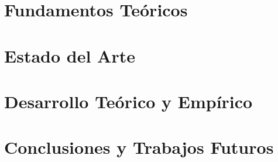 \documentclass[print, color]{ugrTFG}
\let\cleardoublepage\clearpage
\begin{document}
\maketitle

\frontmatter %

   


                    

            
               


\mainmatter %

\part{Fundamentos Teóricos}



\part{Estado del Arte}


\part{Desarrollo Teórico y Empírico}



\part{Conclusiones y Trabajos Futuros}



% 
\end{document}
